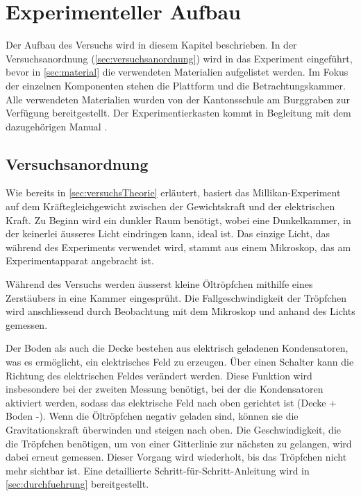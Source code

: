 \chapter{Experimenteller Aufbau}\label{cha:experimentAufbau}
Der Aufbau des Versuchs wird in diesem Kapitel beschrieben. In der Versuchsanordnung (\autoref{sec:versuchsanordnung}) wird in das Experiment eingeführt, bevor in \autoref{sec:material} die verwendeten Materialien aufgelistet werden. Im Fokus der einzelnen Komponenten stehen die Plattform und die Betrachtungskammer. Alle verwendeten Materialien wurden von der Kantonsschule am Burggraben zur Verfügung bereitgestellt. Der Experimentierkasten kommt in Begleitung mit dem dazugehörigen Manual \parencite{instructionManualHalogen}.

\section{Versuchsanordnung}\label{sec:versuchsanordnung}

Wie bereits in \autoref{sec:versuchsTheorie} erläutert, basiert das Millikan-Experiment auf dem Kräftegleichgewicht zwischen der Gewichtskraft und der elektrischen Kraft. Zu Beginn wird ein dunkler Raum benötigt, wobei eine Dunkelkammer, in der keinerlei äusseres Licht eindringen kann, ideal ist. Das einzige Licht, das während des Experiments verwendet wird, stammt aus einem Mikroskop, das am Experimentapparat angebracht ist.

Während des Versuchs werden äusserst kleine Öltröpfchen mithilfe eines Zerstäubers in eine Kammer eingesprüht. Die Fallgeschwindigkeit der Tröpfchen wird anschliessend durch Beobachtung mit dem Mikroskop und anhand des Lichts gemessen.

Der Boden als auch die Decke bestehen aus elektrisch geladenen Kondensatoren, was es ermöglicht, ein elektrisches Feld zu erzeugen. Über einen Schalter kann die Richtung des elektrischen Feldes verändert werden. Diese Funktion wird insbesondere bei der zweiten Messung benötigt, bei der die Kondensatoren aktiviert werden, sodass das elektrische Feld nach oben gerichtet ist (Decke + Boden -). Wenn die Öltröpfchen negativ geladen sind, können sie die Gravitationskraft überwinden und steigen nach oben. Die Geschwindigkeit, die die Tröpfchen benötigen, um von einer Gitterlinie zur nächsten zu gelangen, wird dabei erneut gemessen. Dieser Vorgang wird wiederholt, bis das Tröpfchen nicht mehr sichtbar ist. Eine detaillierte Schritt-für-Schritt-Anleitung wird in \autoref{sec:durchfuehrung} bereitgestellt.

